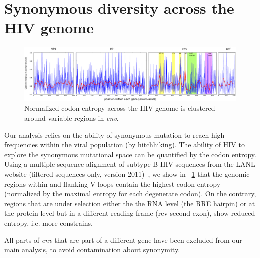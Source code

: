\documentclass[rmp]{revtex4}
\begin{document}
\section{Synonymous diversity across the HIV genome}
\begin{figure}[h]
\begin{center}
\includegraphics[width=\linewidth]{conservation_codons_genome}
\caption{Normalized codon entropy across the HIV genome is clustered around
variable regions in {\it env}.}
\label{fig:syndiv_genome}
\end{center}
\end{figure}

Our analysis relies on the ability of synonymous mutation to reach high
frequencies within the viral population (by hitchhiking). The ability of HIV to
explore the synonymous mutational space can be quantified by the codon entropy.
Using a multiple sequence alignment of subtype-B HIV sequences from the LANL
website (filtered sequences only, version 2011)~\cite{LANL2012}, we show in
\figurename~\ref{fig:syndiv_genome} that the genomic regions within and flanking
V loops contain the highest codon entropy (normalized by the maximal entropy for
each degenerate codon). On the contrary, regions that are under selection either
the the RNA level (the RRE hairpin) or at the protein level but in a different
reading frame (rev second exon), show reduced entropy, i.e. more constrains.

All parts of {\it env} that are part of a different gene have been excluded from
our main analysis, to avoid contamination about synonymity.

\end{document}
